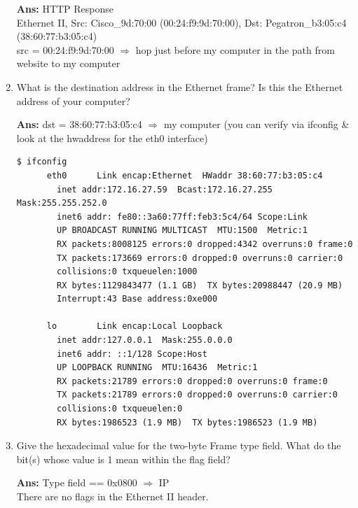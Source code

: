 \documentclass[a4,11pt]{article}
\newenvironment{que}
{ \color{YellowGreen}
  \begin{question}
}
{ \end{question} }
\newenvironment{sol}
{ \color{Black}
  \begin{solution}
}
{ \end{solution} }
\begin{document}
\begin{enumerate}
  \begin{sol}
   \textbf{Ans:} HTTP Response \\
    Ethernet II, Src: Cisco\_9d:70:00 (00:24:f9:9d:70:00), Dst: Pegatron\_b3:05:c4 (38:60:77:b3:05:c4) \\
    src = 00:24:f9:9d:70:00 $\Rightarrow$ hop just before my computer in the path from website to my computer  
  \end{sol}
  
  \item 
  \begin{que}
   What is the destination address in the Ethernet frame? Is this the Ethernet address of your computer?
  \end{que}

  \begin{sol}
 \textbf{Ans:}   dst = 38:60:77:b3:05:c4 $\Rightarrow$ my computer (you can verify via ifconfig \& look at the hwaddress for the eth0 interface)
    \begin{adjustwidth}{-2cm}{}
    \begin{lstlisting}[style=bash]
      $ ifconfig
      eth0      Link encap:Ethernet  HWaddr 38:60:77:b3:05:c4  
		inet addr:172.16.27.59  Bcast:172.16.27.255  Mask:255.255.252.0
		inet6 addr: fe80::3a60:77ff:feb3:5c4/64 Scope:Link
		UP BROADCAST RUNNING MULTICAST  MTU:1500  Metric:1
		RX packets:8008125 errors:0 dropped:4342 overruns:0 frame:0
		TX packets:173669 errors:0 dropped:0 overruns:0 carrier:0
		collisions:0 txqueuelen:1000 
		RX bytes:1129843477 (1.1 GB)  TX bytes:20988447 (20.9 MB)
		Interrupt:43 Base address:0xe000 

      lo        Link encap:Local Loopback  
		inet addr:127.0.0.1  Mask:255.0.0.0
		inet6 addr: ::1/128 Scope:Host
		UP LOOPBACK RUNNING  MTU:16436  Metric:1
		RX packets:21789 errors:0 dropped:0 overruns:0 frame:0
		TX packets:21789 errors:0 dropped:0 overruns:0 carrier:0
		collisions:0 txqueuelen:0 
		RX bytes:1986523 (1.9 MB)  TX bytes:1986523 (1.9 MB)
    \end{lstlisting}   
    \end{adjustwidth}
  \end{sol}

  \item
  \begin{que}
    Give the hexadecimal value for the two-byte Frame type field. What do the bit(s) whose value is 1 mean within the flag field?   
  \end{que}

   \begin{sol}
  \textbf{Ans:}  Type field == 0x0800 $\Rightarrow$ IP \\
    There are no flags in the Ethernet II header.   
   \end{sol}
   
\end{enumerate}
\pagebreak
\end{document}
